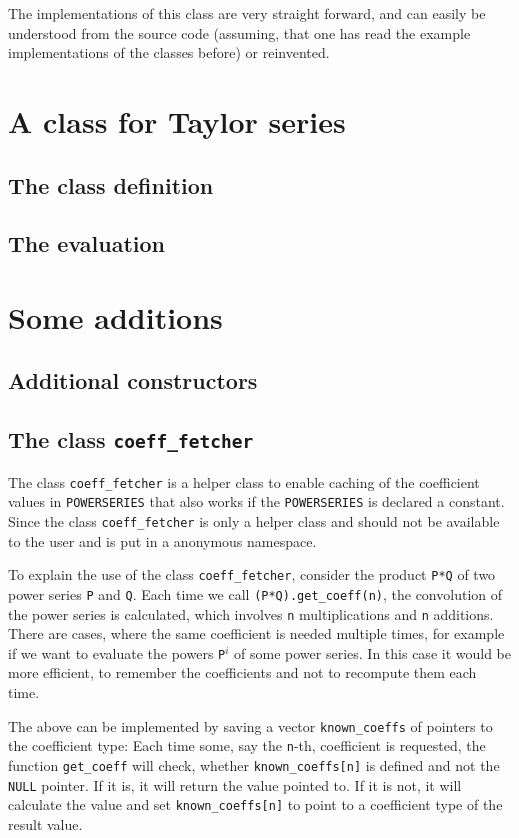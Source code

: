 \documentclass{article}
\newcommand{\code}[1]{\texttt{#1}}
\newcommand{\func}[1]{\texttt{#1}}
\newcommand{\NULL}{\texttt{NULL} pointer\xspace}
\begin{document}
The implementations of this class are very straight forward, and can easily be understood from the source code (assuming, that one has read the example implementations of the classes before) or reinvented.


\section{A class for Taylor series}

\subsection{The class definition}
\subsection{The evaluation}

\section{Some additions}

\subsection{Additional constructors}

\subsection{The class \code{coeff\_fetcher}}

The class \code{coeff\_fetcher} is a helper class to enable caching of the coefficient values in \func{POWERSERIES} that also works if the \func{POWERSERIES} is declared a constant. Since the class \code{coeff\_fetcher} is only a helper class and should not be available to the user and is put in a anonymous namespace.

To explain the use of the class \code{coeff\_fetcher}, consider the product \code{P*Q} of two power series \code{P} and \code{Q}. Each time we call \code{(P*Q).get\_coeff(n)}, the convolution of the power series is calculated, which involves \code{n} multiplications and \code{n} additions. There are cases, where the same coefficient is needed multiple times, for example if we want to evaluate the powers \code{P}$^i$ of some power series. In this case it would be more efficient, to remember the coefficients and not to recompute them each time.

The above can be implemented by saving a vector \code{known\_coeffs} of pointers to the coefficient type: Each time some, say the \code{n}-th, coefficient is requested, the function \code{get\_coeff} will check, whether \code{known\_coeffs[n]} is defined and not the \NULL. If it is, it will return the value pointed to. If it is not, it will calculate the value and set \code{known\_coeffs[n]} to point to a coefficient type of the result value.
\end{document}
